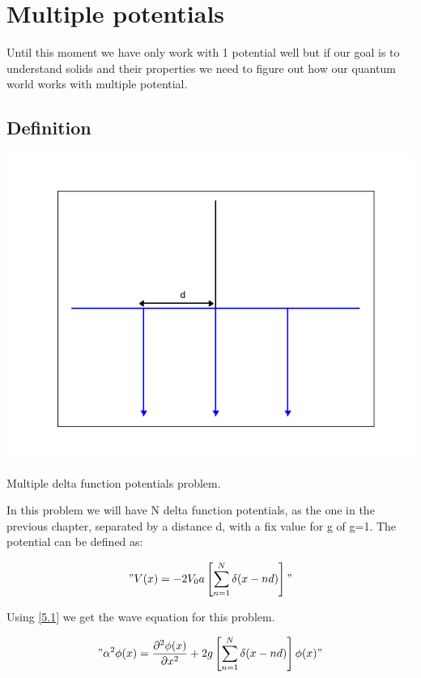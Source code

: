 
\setchapterpreamble[u]{\margintoc}
\chapter{Multiple potentials}

Until this moment we have only work with 1 potential well but if our goal is to understand solids and their properties we need to figure out how our quantum world works with multiple potential.


\section{Definition}

\begin{marginfigure}
  \includegraphics{images5/def.png}
  \centering
  \caption{Multiple delta function potentials problem.}
\end{marginfigure}

In this problem we will have N delta function potentials, as the one in the previous chapter, separated by a distance d, with a fix value for g of g=1. The potential can be defined as:

\begin{equation}
  \label{5.1}
  "V(x) = -2 V_0 a \left[\sum_{n=1}^{N} \delta(x-nd) \right]"
\end{equation}

Using \ref{5.1} we get the wave equation for this problem.

\begin{equation}
  \label{5.2}
  "\alpha^2\phi(x) = \frac{\partial^2\phi(x)}{\partial x^2} + 2 g \left[\sum_{n=1}^{N} \delta(x-nd) \right] \phi(x)"
\end{equation}

